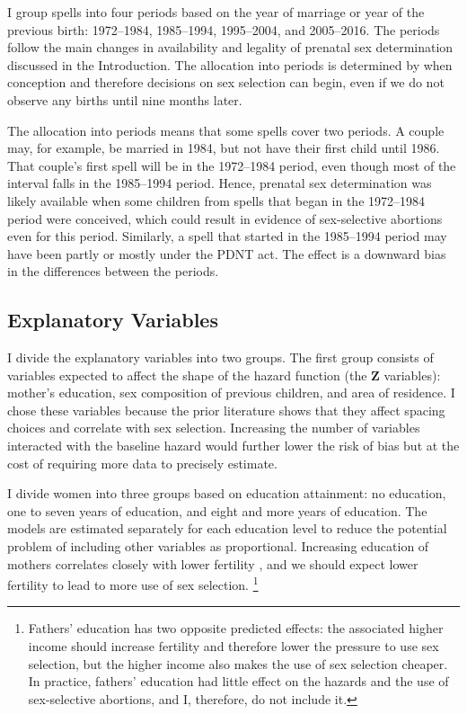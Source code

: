 \documentclass[12pt,letterpaper]{article}
\begin{document}
I group spells into four periods based on the year of marriage
or year of the previous birth:
1972--1984, 1985--1994, 1995--2004, and 2005--2016.
The periods follow the main changes in availability and legality of 
prenatal sex determination discussed in the Introduction.
The allocation into periods is determined by when conception and therefore 
decisions on sex selection can begin, even if we do not observe
any births until nine months later.

The allocation into periods means that some spells cover two periods.
A couple may, for example, be married in 1984, but not have their first 
child until 1986.
That couple's first spell will be in the 1972--1984 period, even though 
most of the interval falls in the 1985--1994 period.
Hence, prenatal sex determination was likely available when some
children from spells that began in the 1972--1984 period were conceived,
which could result in evidence of sex-selective abortions even for this
period.
Similarly, a spell that started in the 1985--1994 period may have been partly 
or mostly under the PDNT act.
The effect is a downward bias in the differences between the periods.

\subsection{Explanatory Variables}

I divide the explanatory variables into two groups.
The first group consists of variables expected to affect the shape of the hazard function
(the $\mathbf{Z}$ variables): 
mother's education, sex composition of previous children, and area of residence.
I chose these variables because the prior literature shows that they affect 
spacing choices and correlate with sex selection.
Increasing the number of variables interacted with the baseline hazard would
further lower the risk of bias but at the cost of requiring more data to 
precisely estimate.

I divide women into three groups based on education attainment: no
education, one to seven years of education, and eight and more years of education.
The models are estimated separately for each education level to reduce
the potential problem of including other variables as proportional.
Increasing education of mothers correlates closely with lower fertility 
\citep{schultz97}, and 
we should expect lower fertility to lead to more use of sex selection.%
\footnote{
Fathers' education has two opposite predicted effects: the associated higher income
should increase fertility and therefore lower the pressure to use sex selection, but
the higher income also makes the use of sex selection cheaper.
In practice, fathers' education had little effect on the hazards and the use of 
sex-selective abortions, and I, therefore, do not include it.
}
\end{document}

